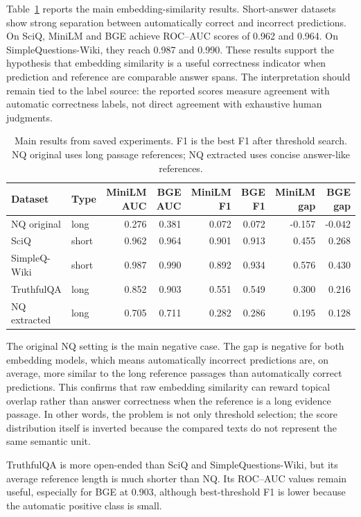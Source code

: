 \documentclass[11pt]{article}
\begin{document}
Table~\ref{tab:main-results} reports the main embedding-similarity results. Short-answer datasets show strong separation between automatically correct and incorrect predictions. On SciQ, MiniLM and BGE achieve ROC--AUC scores of 0.962 and 0.964. On SimpleQuestions-Wiki, they reach 0.987 and 0.990. These results support the hypothesis that embedding similarity is a useful correctness indicator when prediction and reference are comparable answer spans. The interpretation should remain tied to the label source: the reported scores measure agreement with automatic correctness labels, not direct agreement with exhaustive human judgments.

\begin{table}[t]
\centering
\small
\begin{tabular}{llrrrrrr}
\toprule
Dataset & Type & MiniLM AUC & BGE AUC & MiniLM F1 & BGE F1 & MiniLM gap & BGE gap \\
\midrule
NQ original & long & 0.276 & 0.381 & 0.072 & 0.072 & -0.157 & -0.042 \\
SciQ & short & 0.962 & 0.964 & 0.901 & 0.913 & 0.455 & 0.268 \\
SimpleQ-Wiki & short & 0.987 & 0.990 & 0.892 & 0.934 & 0.576 & 0.430 \\
TruthfulQA & long & 0.852 & 0.903 & 0.551 & 0.549 & 0.300 & 0.216 \\
NQ extracted & long & 0.705 & 0.711 & 0.282 & 0.286 & 0.195 & 0.128 \\
\bottomrule
\end{tabular}
\caption{Main results from saved experiments. F1 is the best F1 after threshold search. NQ original uses long passage references; NQ extracted uses concise answer-like references.}
\label{tab:main-results}
\end{table}

The original NQ setting is the main negative case. The gap is negative for both embedding models, which means automatically incorrect predictions are, on average, more similar to the long reference passages than automatically correct predictions. This confirms that raw embedding similarity can reward topical overlap rather than answer correctness when the reference is a long evidence passage. In other words, the problem is not only threshold selection; the score distribution itself is inverted because the compared texts do not represent the same semantic unit.

TruthfulQA is more open-ended than SciQ and SimpleQuestions-Wiki, but its average reference length is much shorter than NQ. Its ROC--AUC values remain useful, especially for BGE at 0.903, although best-threshold F1 is lower because the automatic positive class is small.
\end{document}
